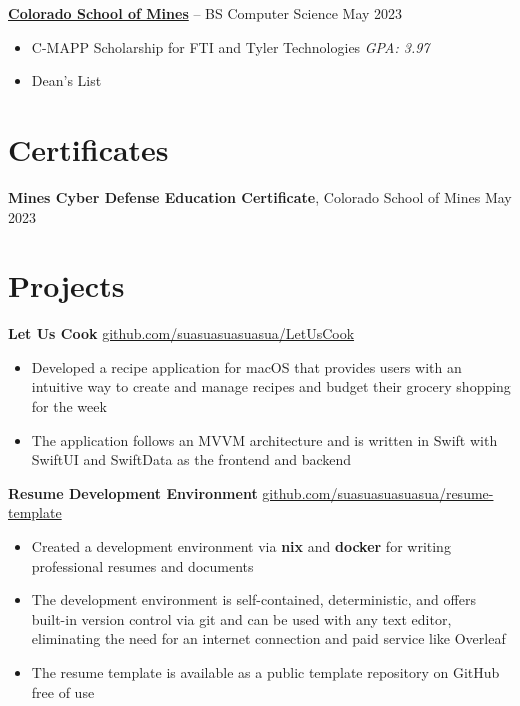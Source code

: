\documentclass[11pt]{article}       %
\begin{document}
\vspace{-6.5pt}

\textbf{\href{https://cs.mines.edu}{Colorado School of Mines}} -- BS Computer Science \hfill May 2023 \\
\vspace{-11.5pt}
\begin{itemize}
	\itemsep -0.5em
	\item C-MAPP Scholarship for FTI and Tyler Technologies \hfill \textit{GPA: 3.97}
	\item Dean's List \hfill
\end{itemize}

\vspace{-18.5pt}

\section*{Certificates}
\textbf{Mines Cyber Defense Education Certificate}, {Colorado School of Mines} \hfill May 2023 \\

\vspace{-6.5pt}

\section*{Projects}
\textbf{Let Us Cook} \hfill \href{https://github.com/suasuasuasuasua/LetUsCook}{github.com/suasuasuasuasua/LetUsCook} \\
\vspace{-9pt}
\begin{itemize}
	\item Developed a recipe application for macOS that provides users with an
	      intuitive way to create and manage recipes and budget their grocery
	      shopping for the week
	\item The application follows an MVVM architecture and is written in Swift
	      with SwiftUI and SwiftData as the frontend and backend
\end{itemize}

\textbf{Resume Development Environment} \hfill
\href{https://github.com/suasuasuasuasua/resume-template}{github.com/suasuasuasuasua/resume-template}
\\
\vspace{-9pt}
\begin{itemize}
	\item Created a development environment via \textbf{nix} and \textbf{docker}
	      for writing professional resumes and documents
	\item The development environment is self-contained, deterministic, and
	      offers built-in version control via git and can be used with any text
	      editor, eliminating the need for an internet connection and paid
	      service like Overleaf
	\item The resume template is available as a public template repository on
	      GitHub free of use
\end{itemize}
\end{document}
